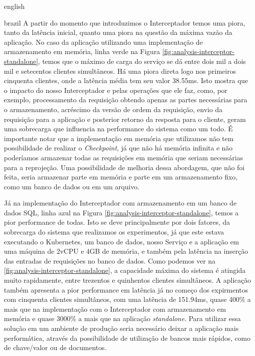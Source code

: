 \begin{otherlanguage*}{english}
\begin{otherlanguage*}{brazil}
A partir do momento que introduzimos o Interceptador temos uma piora, tanto da latência inicial,
quanto uma piora na questão da máxima vazão da aplicação. No caso da aplicação utilizando uma
implementação de armazenamento em memória, linha verde na Figura \ref{fig:analysis-interceptor-standalone},
temos que o máximo de carga do serviço se dá entre dois mil a dois mil e setecentos clientes
simultâneos. Há uma piora direta logo nos primeiros cinquenta clientes, onde a latência
média tem seu valor 38.55ms. Isto mostra que o impacto do nosso Interceptador e pelas
operações que ele faz, como, por exemplo, processamento da requisição obtendo apenas as
partes necessárias para o armazenamento, acréscimo da versão de ordem da requisição,
envio da requisição para a aplicação e posterior retorno da resposta para o cliente, geram
uma sobrecarga que influencia na performance do sistema como um todo. É importante notar que
a implementação em memória que utilizamos não tem possibilidade de realizar o \textit{Checkpoint},
já que não há memória infinita e não poderíamos armazenar todas as requisições em memória
que seriam necessárias para a reprojeção. Uma possibilidade de melhoria dessa abordagem,
que não foi feita, seria armazenar parte em memória e parte em um armazenamento fixo, como
um banco de dados ou em um arquivo.

Já na implementação do Interceptador com armazenamento em um banco de dados SQL, linha azul
na Figura \ref{fig:analysis-interceptor-standalone}, temos a pior performance de todas. Isto
se deve principalmente por dois fatores, da sobrecarga do sistema que realizamos os experimentos,
já que este estava executando o Kubernetes, um banco de dados, nosso Serviço e a aplicação
em uma máquina de 2vCPU e 4GB de memória, e também pela latência na inserção das entradas
de requisições no banco de dados. Como podemos ver na \ref{fig:analysis-interceptor-standalone},
a capacidade máxima do sistema é atingida muito rapidamente, entre trezentos e quinhentos
clientes simultâneos. A aplicação também apresenta a pior performance em latência já no
começo dos expirmentos com cinquenta clientes simultâneos, com uma latência de 151.94ms,
quase 400\% a mais que na implementação com o Interceptador com armazenamento em memória e
quase 3000\% a mais que na aplicação \textit{standalone}. Para utilizar essa solução em
um ambiente de produção seria necessário deixar a aplicação mais performática, através da
possibilidade de utilização de bancos mais rápidos, como de chave/valor ou de documentos.


\end{otherlanguage*}
\end{otherlanguage*}
